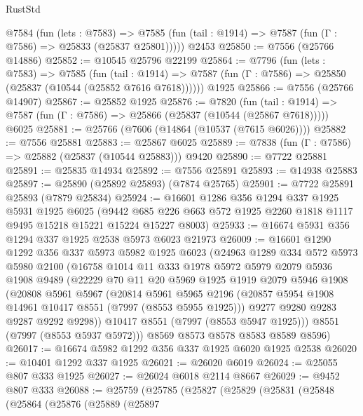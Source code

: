 \begin{lexlean}{RustStd}
\begin{coremodule}
{\begin{coremodule}
{{{{{{{{{{{{{{{{{{{{{{{{{{{{{{{{{{{{{{{{{{{    @7584
      (fun (lets : @7583) =>
      @7585 (fun (tail : @1914) => @7587 (fun (Γ : @7586) => @25833 (@25837 @25801)))))
    @2453
@25850 := @7556 (@25766 @14886)
@25852 := @10545 @25796 @22199
@25864 := @7796
    (fun (lets : @7583) =>
    @7585
      (fun (tail : @1914) =>
      @7587 (fun (Γ : @7586) => @25850 (@25837 (@10544 (@25852 @7616 @7618))))))
    @1925
@25866 := @7556 (@25766 @14907)
@25867 := @25852 @1925
@25876 := @7820
    (fun (tail : @1914) => @7587 (fun (Γ : @7586) => @25866 (@25837 (@10544 (@25867 @7618)))))
    @6025
@25881 := @25766 (@7606 (@14864 (@10537 (@7615 @6026))))
@25882 := @7556 @25881
@25883 := @25867 @6025
@25889 := @7838 (fun (Γ : @7586) => @25882 (@25837 (@10544 @25883))) @9420
@25890 := @7722 @25881
@25891 := @25835 @14934
@25892 := @7556 @25891
@25893 := @14938 @25883
@25897 := @25890 (@25892 @25893) (@7874 @25765)
@25901 := @7722 @25891 @25893 (@7879 @25834)
@25924 := @16601
    @1286
    @356
    @1294
    @337
    @1925
    @5931
    @1925
    @6025
    (@9442 @685 @226 @663 @572 @1925 @2260 @1818 @1117 @9495 @15218 @15221 @15224 @15227 @8003)
@25933 := @16674 @5931 @356 @1294 @337 @1925 @2538 @5973 @6023 @21973
@26009 := @16601
    @1290
    @1292
    @356
    @337
    @5973
    @5982
    @1925
    @6023
    (@24963
      @1289
      @334
      @572
      @5973
      @5980
      @2100
      (@16758
        @1014
        @11
        @333
        @1978
        @5972
        @5979
        @2079
        @5936
        @1908
        @9489
        (@22229
          @70
          @11
          @20
          @5969
          @1925
          @1919
          @2079
          @5946
          @1908
          (@20808
            @5961
            @5967
            (@20814
              @5961
              @5965
              @2196
              (@20857 @5954 @1908 @14961 @10417 @8551 (@7997 (@8553 @5955 @1925)))
              @9277
              @9280
              @9283
              @9287
              @9292
              @9298))
          @10417
          @8551
          (@7997 (@8553 @5947 @1925)))
        @8551
        (@7997 (@8553 @5937 @5972)))
      @8569
      @8573
      @8578
      @8583
      @8589
      @8596)
@26017 := @16674 @5982 @1292 @356 @337 @1925 @6020 @1925 @2538
@26020 := @10401 @1292 @337 @1925
@26021 := @26020 @6019
@26024 := @25055 @807 @333 @1925
@26027 := @26024 @6018 @2114 @8667
@26029 := @9452 @807 @333
@26088 := @25759
    (@25785
      (@25827
        (@25829
          (@25831
            (@25848
              (@25864
                (@25876
                  (@25889
                    (@25897
}}}}}}}}}}}}}}}}}}}}}}}}}}}}}}}}}}}}}}}}}}}
\end{coremodule}}
\end{coremodule}
\end{lexlean}
